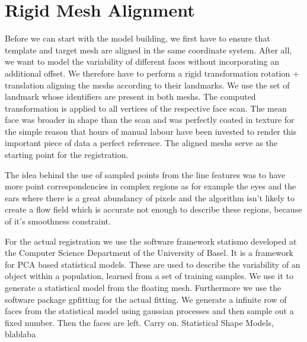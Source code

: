 \section{Rigid Mesh Alignment}
Before we can start with the model building, we first have to ensure that template and target mesh are aligned in the same coordinate system. After all, we want to model the variability of different faces without incorporating an additional offset. We therefore have to perform a rigid transformation  
rotation + translation
aligning the meshs according to their landmarks.  We use the set of landmark whose identifiers are present in both meshs.
The computed transformation is applied to all vertices of the respective face scan. 
The mean face was broader in shape than the scan and was perfectly coated in texture for the simple reason that hours of manual labour have been invested to render this important piece of data a perfect reference.
The aligned meshs serve as the starting point for the registration.

The idea behind the use of sampled points from the line features was to have more point correspondencies in complex regions as for example the eyes and the ears where there is a great abundancy of pixels and the algorithm isn’t likely to create a flow field which is accurate not enough to describe these regions, because of it’s smoothness constraint.


For the actual registration we use the software framework statismo developed at the Computer Science Department of the University of Basel. It is a framework for PCA based statistical models. These are used to describe the variability of an object within a population, learned from a set of training samples. We use it to generate a statistical model from the floating mesh. Furthermore we use the software package gpfitting for the actual fitting. We generate a infinite row of
    faces from the statistical model using gaussian processes and then sample out a fixed number. Then the faces are left. Carry on.
Statistical Shape Models, blablaba

